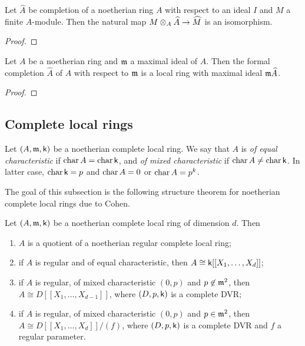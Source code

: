     \begin{proposition}\label{prop: completion and tensor product}
        Let \(\widehat{A}\) be completion of a noetherian ring \(A\) with respect to an ideal \(I\) and \(M\) a finite \(A\)-module. 
        Then the natural map \(M \otimes_A \widehat{A} \to \widehat{M}\) is an isomorphism.
    \end{proposition}
    \begin{proof}
    \end{proof}

    \begin{proposition}\label{prop: completion with respect to maximal ideal is local}
        Let \(A\) be a noetherian ring and \({\mathfrak{m}}\) a maximal ideal of \(A\). 
        Then the formal completion \(\widehat{A}\) of \(A\) with respect to \({\mathfrak{m}}\) is a local ring with maximal ideal \({\mathfrak{m}} \widehat{A}\).
    \end{proposition}
    \begin{proof}
    \end{proof}

\subsection{Complete local rings}

    Let \((A, {\mathfrak{m}}, {\mathsf{k}})\) be a noetherian complete local ring.
    We say that \(A\) is \emph{of equal characteristic} if \(\operatorname{char} A = \operatorname{char} {\mathsf{k}}\), and \emph{of mixed characteristic} if \(\operatorname{char} A \neq \operatorname{char} {\mathsf{k}}\).
    In latter case, \(\operatorname{char} {\mathsf{k}} = p\) and \(\operatorname{char} A = 0\) or \(\operatorname{char} A = p^k\).

    The goal of this subsection is the following structure theorem for noetherian complete local rings due to Cohen. 

    \begin{theorem}\label{thm: Cohen Structure Theorem}
        Let \((A,{\mathfrak{m}},{\mathsf{k}})\) be a noetherian complete local ring of dimension \(d\).
        Then 
        \begin{enumerate}
            \item \(A\) is a quotient of a noetherian regular complete local ring;
            \item if \(A\) is regular and of equal characteristic, then \(A \cong {\mathsf{k}}[[X_1, \ldots, X_d]]\);
            \item if \(A\) is regular, of mixed characteristic \((0,p)\) and \(p \not\in {\mathfrak{m}}^2\), then \(A \cong D[[X_1, \ldots, X_{d-1}]]\), where \((D,p,{\mathsf{k}})\) is a complete DVR;
            \item if \(A\) is regular, of mixed characteristic \((0,p)\) and \(p \in {\mathfrak{m}}^2\), then \(A \cong D[[X_1, \ldots, X_{d}]]/(f)\), where \((D,p,{\mathsf{k}})\) is a complete DVR and \(f\) a regular parameter.
        \end{enumerate}
    \end{theorem}

